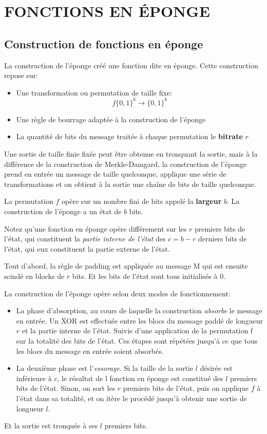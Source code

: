 \documentclass[10.5pt, a4paper, twoside, openright]{report}
\begin{document}
\chapter{FONCTIONS EN ÉPONGE}
\section{Construction de fonctions en éponge}
La construction de l'éponge créé une fonction dite en éponge. Cette construction repose sur:
\begin{itemize}
\item{Une transformation ou permutation de taille fixe:
$$f{\{0,1\}}^b \rightarrow {\{0,1\}}^b$$}
\item{Une règle de bourrage adaptée à la construction de l'éponge}
\item{La quantité de bits du message traitée à chaque permutation le \textbf{bitrate} $r$}
\end{itemize}

Une sortie de taille finie fixée peut être obtenue en tronquant la sortie, mais à la différence de la construction de Merkle-Damgard, la construction de l'éponge prend en entrée un message de taille quelconque, applique une série de transformations et on obtient à la sortie une chaîne de bits de taille quelconque.

La permutation $f$ opère sur un nombre fini de bits appelé la \textbf{largeur} $b$. La construction de l'éponge a un état de $b$ bits.

Notez qu'une fonction en éponge opère différement sur les $r$ premiers bits de l'état, qui constituent la \emph{partie interne de l'état} des $c=b-r$ derniers bits de l'état, qui eux constituent la partie externe de l'état.

Tout d'abord, la règle de padding est appliquée au message M qui est ensuite scindé en blocks de $r$ bits.
Et les bits de l'état sont tous initialisés à 0. 

La construction de l'éponge opère selon deux modes de fonctionnement:
\begin{itemize}
\item{La phase d'absorption, au cours de laquelle la construction \emph{absorbe} le message en entrée. 
Un XOR est effectuée entre les blocs du message paddé de longueur $r$ et la partie interne de l'état. Suivie d'une application de la permutation f sur la totalité des bits de l'état.
Ces étapes sont répétées jusqu'à ce que tous les blocs du message en entrée soient absorbés.}

\item{La deuxième phase est l'\emph{essorage}. Si la taille de la sortie $l$ désirée est inférieure à $c$, le résultat de l fonction en éponge est constitué des $l$ premiers bits de l'état. Sinon, on sort les $r$ premiers bits de l'état, puis on applique $f$ à l'état dans sa totalité, et on itère le procédé jusqu'à obtenir une sortie de longueur $l$.}
\end{itemize} 
Et la sortie est tronquée à ses $l$ premiers bits.
\end{document}

